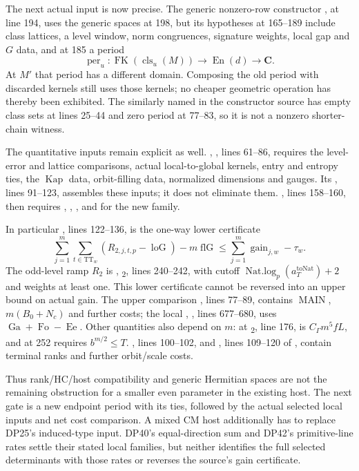 \documentclass[11pt,a4paper]{article}
\theoremstyle{definition}\newtheorem{remark}[theorem]{Remark}
\begin{document}
The next actual input is now precise. The generic nonzero-row constructor
,  at line 194, uses the generic spaces at 198, but its hypotheses at 165--189 include class lattices, a level window, norm congruences, signature weights, local gap and $G$ data, and at 185 a period
\[
 \operatorname{per}_u:\operatorname{FK}(\operatorname{cls}_u(M))
        \longrightarrow\operatorname{En}(d)\longrightarrow\mathbf C.
\]
At $M'$ that period has a different domain. Composing the old period with discarded kernels still uses those kernels; no cheaper geometric operation has thereby been exhibited. The similarly named  in the constructor source has empty class sets at lines 25--44 and zero period at 77--83, so it is not a nonzero shorter-chain witness.

The quantitative inputs remain explicit as well.
, , lines 61--86, requires the level-error and lattice comparisons, actual local-to-global kernels, entry and entropy ties, the $\operatorname{Kap}$ data, orbit-filling data, normalized dimensions and gauges. Its , lines 91--123, assembles these inputs; it does not eliminate them. , lines 158--160, then requires , , ,  and  for the new family.

In particular , lines 122--136, is the one-way lower certificate
\[
 \sum_{j=1}^m\sum_{t\in\mathrm{TT}_w}
       (R_{2,j,t,p}-\operatorname{loG})-m\operatorname{flG}
 \le\sum_{j=1}^m\operatorname{gain}_{j,w}-\tau_w.
\]
The odd-level ramp $R_2$ is ,
\textsubscript{2}, lines 240--242, with cutoff
$\operatorname{Nat.log}_p(a_T^{\mathrm{toNat}})+2$ and weights at least one. This lower certificate cannot be reversed into an upper bound on actual gain.
The upper comparison , lines 77--89, contains
$\operatorname{MAIN}$, $m(B_0+N_c)$ and further costs; the local
, , lines 677--680, uses
$\operatorname{Ga}+\operatorname{Fo}-\operatorname{Ee}$.
Other quantities also depend on $m$:  at
\textsubscript{2}, line 176, is
$C_\Gamma m^5fL$, and  at 252 requires $b^{m/2}\le T$.
, lines 100--102, and , lines 109--120 of
, contain terminal ranks and further orbit/scale costs.

Thus rank/HC/host compatibility and generic Hermitian spaces are not the remaining obstruction for a smaller even parameter in the existing host. The next gate is a new endpoint period with its ties, followed by the actual selected local inputs and net cost comparison. A mixed CM host additionally has to replace DP25's induced-type input. DP40's equal-direction sum and DP42's primitive-line rates settle their stated local families, but neither identifies the full selected determinants with those rates or reverses the source's gain certificate.
\end{document}

